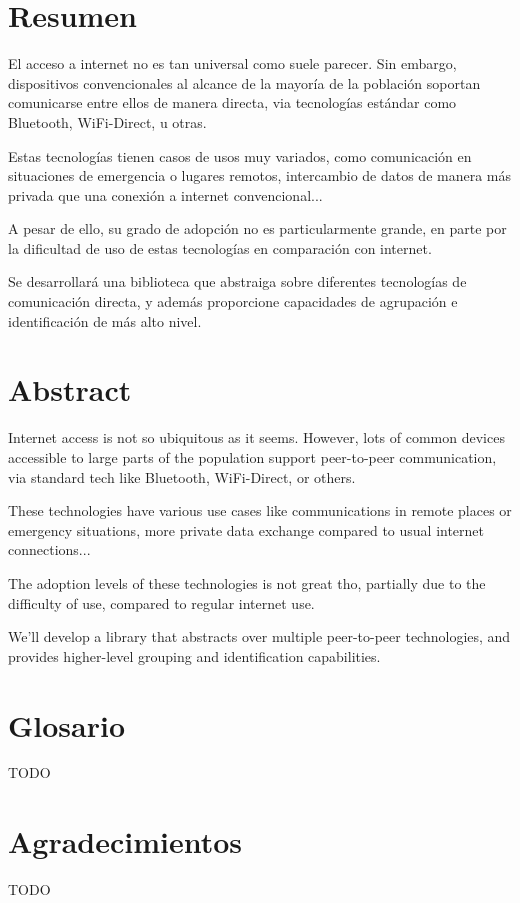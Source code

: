 \section*{Resumen}

El acceso a internet no es tan universal como suele parecer. Sin embargo,
dispositivos convencionales al alcance de la mayoría de la población soportan
comunicarse entre ellos de manera directa, via tecnologías estándar como
Bluetooth, WiFi-Direct, u otras.

Estas tecnologías tienen casos de usos muy variados, como comunicación en
situaciones de emergencia o lugares remotos, intercambio de datos de manera más
privada que una conexión a internet convencional...

A pesar de ello, su grado de adopción no es particularmente grande, en parte
por la dificultad de uso de estas tecnologías en comparación con internet.

Se desarrollará una biblioteca que abstraiga sobre diferentes tecnologías de
comunicación directa, y además proporcione capacidades de agrupación e
identificación de más alto nivel.

\clearpage

\section*{Abstract}

Internet access is not so ubiquitous as it seems. However, lots of common
devices accessible to large parts of the population support peer-to-peer
communication, via standard tech like Bluetooth, WiFi-Direct, or others.

These technologies have various use cases like communications in remote places
or emergency situations, more private data exchange compared to usual internet
connections...

The adoption levels of these technologies is not great tho, partially due to
the difficulty of use, compared to regular internet use.

We'll develop a library that abstracts over multiple peer-to-peer technologies,
and provides higher-level grouping and identification capabilities.

\clearpage

\section*{Glosario}

TODO

\clearpage

\section*{Agradecimientos}

TODO
